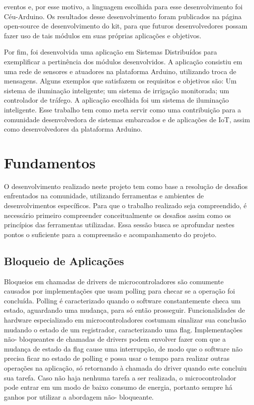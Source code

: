 \documentclass{article}
\begin{document}
eventos e, por esse motivo, a linguagem escolhida para esse desenvolvimento foi Céu-Arduino. Os
resultados desse desenvolvimento foram publicados na página open-source de desenvolvimento do
kit, para que futuros desenvolvedores possam fazer uso de tais módulos em suas próprias aplicações
e objetivos.
\par Por fim, foi desenvolvida uma aplicação em Sistemas Distribuídos para exemplificar a pertinência
dos módulos desenvolvidos. A aplicação consistiu em uma rede de sensores e atuadores na
plataforma Arduino, utilizando troca de mensagens. Alguns exemplos que satisfazem
os requisitos e objetivos são: Um sistema de iluminação inteligente; um sistema de irrigação
monitorada; um controlador de tráfego. A aplicação escolhida foi um sistema de iluminação inteligente. Esse trabalho tem como meta servir como uma contribuição
para a comunidade desenvolvedora de sistemas embarcados e de aplicações de IoT, assim como
desenvolvedores da plataforma Arduino. \cite{wortmann2015} \cite{chui2010} \cite{edwards1997} \cite{githubceu} \cite{atmegadatasheet}

\section{Fundamentos}

\tab O desenvolvimento realizado neste projeto tem como base a resolução de desafios enfrentados na comunidade, utilizando ferramentas e ambientes de desenvolvimentos específicos. Para que o trabalho realizado seja compreendido, é necessário primeiro compreender conceitualmente os desafios assim como os princípios das ferramentas utilizadas. Essa sessão busca se aprofundar nestes pontos o suficiente para a compreensão e acompanhamento do projeto. 

\subsection{Bloqueio de Aplicações}

\tab Bloqueios em chamadas de drivers de microcontroladores são comumente causados por implementações que usam polling para checar se a operação foi concluída. Polling é caracterizado
quando o software constantemente checa um estado, aguardando uma mudança, para só então
prosseguir. Funcionalidades de hardware especializado em microcontroladores costumam sinalizar sua
conclusão mudando o estado de um registrador, caracterizando uma flag. Implementações não-
bloqueantes de chamadas de drivers podem envolver fazer com que a mudança de estado da flag cause
uma interrupção, de modo que o software não precisa ficar no estado de polling e possa usar o tempo
para realizar outras operações na aplicação, só retornando à chamada do driver quando este concluiu
sua tarefa. Caso não haja nenhuma tarefa a ser realizada, o microcontrolador pode entrar em um
modo de baixo consumo de energia, portanto sempre há ganhos por utilizar a abordagem não-
bloqueante.
\end{document}
